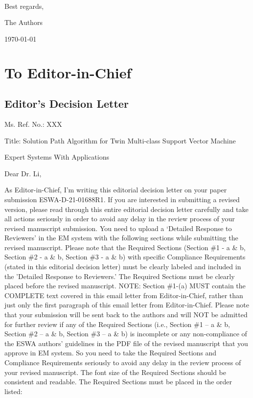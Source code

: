 \documentclass[12pt, review, authoryear]{elsarticle}
\def\mycoauthor{The Authors}
\def\mydate{\today} %
\begin{document}
~\\
\noindent Best regards,

\noindent \mycoauthor

\noindent \mydate


\tableofcontents
\newpage

\section{To Editor-in-Chief}


\subsection{Editor’s Decision Letter}

Ms. Ref. No.: XXX

Title: Solution Path Algorithm for Twin Multi-class Support Vector Machine

Expert Systems With Applications

Dear Dr. Li, 

As Editor-in-Chief, I’m writing this editorial decision letter on your paper submission ESWA-D-21-01688R1.  If you are interested in submitting a revised version, please read through this entire editorial decision letter carefully and take all actions seriously in order to avoid any delay in the review process of your revised manuscript submission.  You need to upload a ‘Detailed Response to Reviewers’ in the EM system with the following sections while submitting the revised manuscript. Please note that the Required Sections (Section \#1 - a \& b, Section \#2 - a \& b, Section \#3 - a \& b) with specific Compliance Requirements (stated in this editorial decision letter) must be clearly labeled and included in the 'Detailed Response to Reviewers.’  The Required Sections must be clearly placed before the revised manuscript. NOTE: Section \#1-(a) MUST contain the COMPLETE text covered in this email letter from Editor-in-Chief, rather than just only the first paragraph of this email letter from Editor-in-Chief. Please note that your
submission will be sent back to the authors and will NOT be admitted for further review if any of the Required Sections (i.e., Section \#1 – a \& b, Section \#2 – a \& b, Section \#3 – a \& b) is incomplete or any non-compliance of the ESWA authors’ guidelines in the PDF file of the revised manuscript that you approve in EM system.  So you need to take the Required Sections and Compliance Requirements seriously to avoid any delay in the review process of your revised manuscript.  The font size of the Required Sections should be consistent and readable. The Required Sections must be placed in the order listed: 
\end{document}
